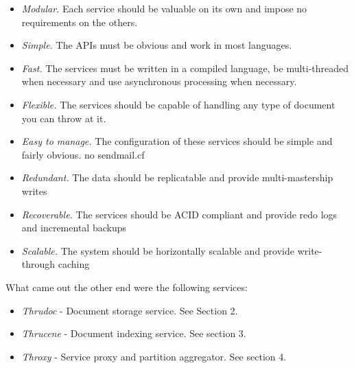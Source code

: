 \documentclass[nocopyrightspace,blockstyle]{sigplanconf}
\begin{document}
\begin{itemize}

\item\textit{Modular.} Each service should be valuable on its own and impose no requirements on the others.

\item\textit{Simple.} The APIs must be obvious and work in most languages.

\item\textit{Fast.} The services must be written in a compiled language, be multi-threaded when necessary and use asynchronous processing when necessary.

\item\textit{Flexible.} The services should be capable of handling any type of document you can throw at it.

\item\textit{Easy to manage.} The configuration of these services should be simple and fairly obvious. no sendmail.cf

\item\textit{Redundant.} The data should be replicatable and provide multi-mastership writes

\item\textit{Recoverable.} The services should be ACID compliant and provide redo logs and incremental backups

\item\textit{Scalable.} The system should be horizontally scalable and provide write-through caching
\end{itemize}

What came out the other end were the following services:

\begin{itemize}
\item\textit{Thrudoc}   - Document storage service. See Section 2.

\item\textit{Thrucene}  - Document indexing service. See section 3.

\item\textit{Throxy}    - Service proxy and partition aggregator. See section 4.
\end{itemize}
\end{document}
